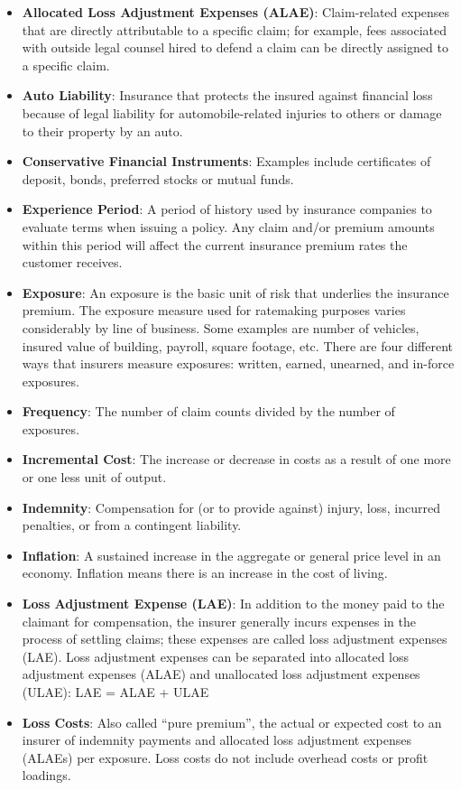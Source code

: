 \documentclass[12pt]{article}
\begin{document}
\begin{itemize}
\item \textbf{Allocated Loss Adjustment Expenses (ALAE)}: Claim-related expenses that are directly attributable to a specific claim; for example, fees associated with outside legal counsel hired to defend a claim can be directly assigned to a specific claim. 
\item \textbf{Auto Liability}: Insurance that protects the insured against financial loss because of legal liability for automobile-related injuries to others or damage to their property by an auto.
\item \textbf{Conservative Financial Instruments}: Examples include certificates of deposit, bonds, preferred stocks or mutual funds.
\item \textbf{Experience Period}: A period of history used by insurance companies to evaluate terms when issuing a policy. Any claim and/or premium amounts within this period will affect the current insurance premium rates the customer receives.
\item \textbf{Exposure}: An exposure is the basic unit of risk that underlies the insurance premium. The exposure measure used for ratemaking purposes varies considerably by line of business.  Some examples are number of vehicles, insured value of building, payroll, square footage, etc.  There are four different ways that insurers measure exposures: written, earned, unearned, and in-force exposures.
\item \textbf{Frequency}: The number of claim counts divided by the number of exposures.
\item \textbf{Incremental Cost}: The increase or decrease in costs as a result of one more or one less unit of output.
\item \textbf{Indemnity}: Compensation for (or to provide against) injury, loss, incurred penalties, or from a contingent liability.
\item \textbf{Inflation}: A sustained increase in the aggregate or general price level in an economy. Inflation means there is an increase in the cost of living.
\item \textbf{Loss Adjustment Expense (LAE)}: In addition to the money paid to the claimant for compensation, the insurer generally incurs expenses in the process of settling claims; these expenses are called loss adjustment expenses (LAE). Loss adjustment expenses can be separated into allocated loss adjustment expenses (ALAE) and unallocated loss adjustment expenses (ULAE): LAE = ALAE + ULAE
\item \textbf{Loss Costs}: Also called ``pure premium'', the actual or expected cost to an insurer of indemnity payments and allocated loss adjustment expenses (ALAEs) per exposure. Loss costs do not include overhead costs or profit loadings.

\end{itemize}
\end{document}
